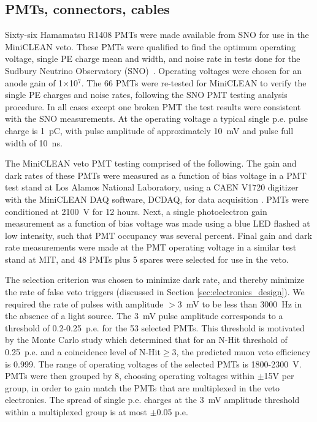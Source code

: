 \documentclass[review,number,sort&compress]{elsarticle}
\begin{document}
\subsection{PMTs, connectors, cables}
\label{sec:pmts}
%
Sixty-six Hamamatsu R1408 PMTs were made available from SNO for use in the
MiniCLEAN veto. These PMTs were qualified to find the optimum
operating voltage, single PE charge mean and width, and noise rate in
tests done for the Sudbury Neutrino Observatory
(SNO)~\cite{ref:sno_pmt_paper}.  Operating voltages were chosen for an
anode gain of 1$\times$10$^7$.  The 66 PMTs were re-tested for
MiniCLEAN to verify the single PE charges and noise rates, following
the SNO PMT testing analysis procedure.  In all cases except one
broken PMT the test results were consistent with the SNO measurements.
At the operating voltage a typical single p.e. pulse charge is 1~pC,
with pulse amplitude of approximately 10~mV and pulse full width of
10~ns.

The MiniCLEAN veto PMT testing comprised of the following.  The gain and
dark rates of these PMTs were measured as a function of bias voltage
in a PMT test stand at Los Alamos National Laboratory, using a CAEN
V1720 digitizer with the MiniCLEAN DAQ software, DCDAQ, for data
acquisition \cite{ref:gastler_thesis}. PMTs were conditioned at 2100~V
for 12 hours. Next, a single photoelectron gain measurement as a
function of bias voltage was made using a blue LED flashed at low
intensity, such that PMT occupancy was several percent. Final gain and
dark rate measurements were made at the PMT operating voltage in a
similar test stand at MIT, and 48 PMTs plus 5 spares were selected for
use in the veto. 

The selection criterion was chosen to minimize dark rate, and thereby
minimize the rate of false veto triggers (discussed in Section
\ref{sec:electronics_design}).  We required the rate of pulses with
amplitude $>$3~mV to be less than 3000~Hz in the absence of a light
source.  The 3~mV pulse amplitude corresponds to a threshold of
0.2-0.25~p.e. for the 53 selected PMTs.  This threshold is motivated
by the Monte Carlo study which determined that for an N-Hit threshold
of 0.25~p.e. and a coincidence level of N-Hit$\ge$3, the predicted
muon veto efficiency is 0.999.  The range of operating voltages of the
selected PMTs is 1800-2300~V.  PMTs were then grouped by 8, choosing
operating voltages within $\pm$15V per group, in order to gain match
the PMTs that are multiplexed in the veto electronics.  The spread of
single p.e. charges at the 3~mV amplitude threshold within a
multiplexed group is at most $\pm$0.05 p.e.
\end{document}
